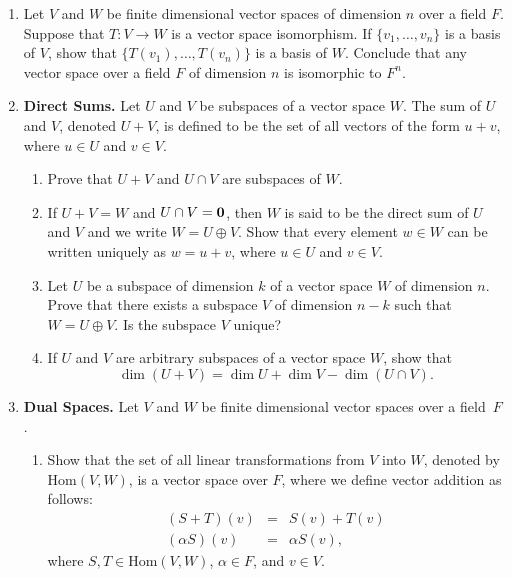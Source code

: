 {\begin{enumerate}
\begin{enumerate}
\end{enumerate}


\bf\item\rm
Let $V$ and $W$ be finite dimensional vector spaces of dimension $n$
over a field $F$. Suppose that  $T: V \rightarrow W$ is a vector space
isomorphism.  If $\{ v_1, \ldots, v_n \}$ is a basis of $V$, show that
$\{ T(v_1), \ldots, T(v_n) \}$ is a basis of $W$. Conclude that any
vector space over a field $F$ of dimension $n$ is isomorphic to $F^n$. 


\bf\item\rm
{\bf Direct Sums.} 
Let $U$ and $V$ be subspaces of a vector space $W$. The sum of $U$ and
$V$, denoted $U + V$, is defined to be the set of all vectors of the
form $u + v$, where $u \in U$ and $v \in V$. 
\begin{enumerate}

   \bf\item\rm
Prove that $U + V$ and $U \cap V$ are subspaces of $W$.

   \bf\item\rm
If $U + V = W$ and $U \cap V = {\bold 0}$, then $W$ is said to be the
{\bfi direct sum\/} of $U$ and $V$ and we write $W = U \oplus
V$\label{notedirectsum}.
Show that every element $w \in W$ can be written uniquely as $w = u +
v$, where $u \in U$ and $v \in V$.

   \bf\item\rm
Let $U$ be a subspace of dimension $k$ of a vector space $W$ of
dimension $n$. Prove that there exists a subspace $V$ of dimension
$n-k$ such that $W = U \oplus V$.  Is the subspace $V$ unique?

   \bf\item\rm
If $U$ and $V$ are arbitrary subspaces of a vector space $W$, show
that 
\[
\dim( U + V) = \dim U + \dim V - \dim( U \cap V).
\]

\end{enumerate}


\bf\item\rm
{\bf Dual Spaces.} 
Let $V$ and $W$ be finite dimensional vector spaces over a field~$F$. 
\begin{enumerate}

   \bf\item\rm
Show that the set of all linear transformations from $V$ into $W$,
denoted by $\mbox{Hom}(V, W)$\label{noteHom}, 
is a vector space over $F$, where we
define vector addition as follows:
\begin{eqnarray*}
(S + T)(v) &= & S(v) +T(v) \\
(\alpha S)(v) & = & \alpha S(v),
\end{eqnarray*}
where $S, T \in \mbox{Hom}(V, W)$, $\alpha \in F$, and $v \in V$.
 

\end{enumerate}
\end{enumerate}}
